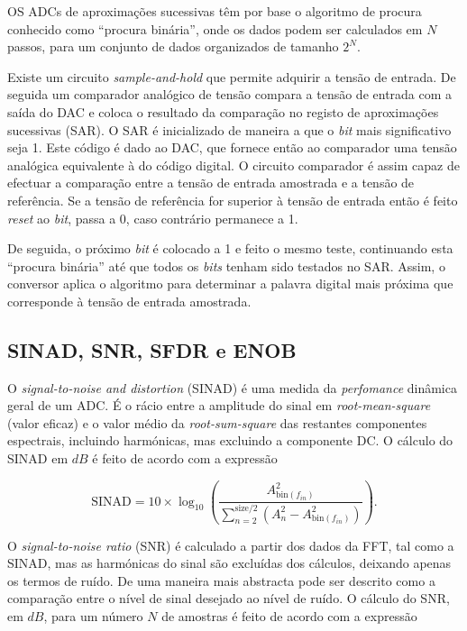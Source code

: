 \documentclass[11pt]{article}
\numberwithin{equation}{section}
\begin{document}
OS ADCs de aproximações sucessivas têm por base o algoritmo de procura conhecido como ``procura binária'', onde os dados podem ser calculados em $N$ passos, para um conjunto de dados organizados de tamanho $2^N$.

Existe um circuito \textit{sample-and-hold} que permite adquirir a tensão de entrada. De seguida um comparador analógico de tensão compara a tensão de entrada com a saída do DAC e coloca o resultado da comparação no registo de aproximações sucessivas (SAR). O SAR é inicializado de maneira a que o \textit{bit} mais significativo seja 1. Este código é dado ao DAC, que fornece então ao comparador uma tensão analógica equivalente à do código digital. O circuito comparador é assim capaz de efectuar a comparação entre a tensão de entrada amostrada e a tensão de referência. Se a tensão de referência for superior à tensão de entrada então é feito \textit{reset} ao \textit{bit}, passa a 0, caso contrário permanece a 1. 

De seguida, o próximo \textit{bit} é colocado a 1 e feito o mesmo teste, continuando esta ``procura binária'' até que todos os \textit{bits} tenham sido testados no SAR. Assim, o conversor aplica o algoritmo para determinar a palavra digital mais próxima que corresponde à tensão de entrada amostrada.

\subsection{SINAD, SNR, SFDR e ENOB}

O \textit{signal-to-noise and distortion} (SINAD) é uma medida da \textit{perfomance} dinâmica geral de um ADC. É o rácio entre a amplitude do sinal em \textit{root-mean-square} (valor eficaz) e o valor médio da \textit{root-sum-square} das restantes componentes espectrais, incluindo harmónicas, mas excluindo a componente DC. O cálculo do SINAD em $dB$ é feito de acordo com a expressão

\vspace{-3mm}
\begin{equation}
\text{SINAD} = 10\times \log_{10} \left(\frac{A^{2}_{\text{bin}(f_{in})}}{\sum_{n=2}^{\text{size}/2}\left(A^{2}_{n} - A^{2}_{\text{bin}(f_{in})}\right)}\right).
\label{eq:SINAD}
\end{equation}

\vspace{1mm}
O \textit{signal-to-noise ratio} (SNR) é calculado a partir dos dados da FFT, tal como a SINAD, mas as harmónicas do sinal são excluídas dos cálculos, deixando apenas os termos de ruído. De uma maneira mais abstracta pode ser descrito como a comparação entre o nível de sinal desejado ao nível de ruído. O cálculo do SNR, em $dB$, para um número $N$ de amostras  é feito de acordo com a expressão
\end{document}
